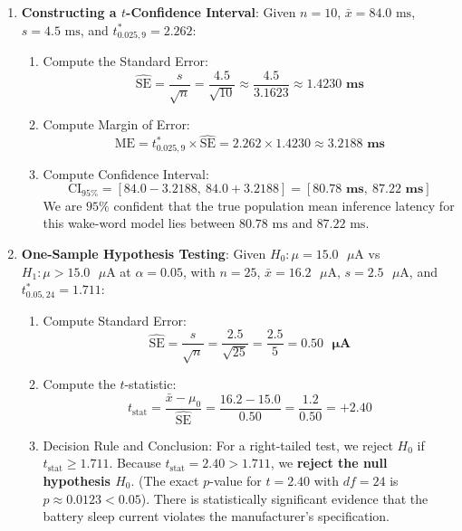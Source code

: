 \begin{enumerate}
    \item \textbf{Constructing a $t$-Confidence Interval}:
    Given $n = 10$, $\bar{x} = 84.0\text{ ms}$, $s = 4.5\text{ ms}$, and $t_{0.025, 9}^* = 2.262$:
    \begin{enumerate}[label=(\alph*)]
        \item Compute the Standard Error:
        \begin{equation*}
        \widehat{\text{SE}} = \frac{s}{\sqrt{n}} = \frac{4.5}{\sqrt{10}} \approx \frac{4.5}{3.1623} \approx \mathbf{1.4230\text{ ms}}
        \end{equation*}
        \item Compute Margin of Error:
        \begin{equation*}
        \text{ME} = t_{0.025, 9}^* \times \widehat{\text{SE}} = 2.262 \times 1.4230 \approx \mathbf{3.2188\text{ ms}}
        \end{equation*}
        \item Compute Confidence Interval:
        \begin{equation*}
        \text{CI}_{95\%} = [84.0 - 3.2188, \ 84.0 + 3.2188] = [\mathbf{80.78\text{ ms}}, \ \mathbf{87.22\text{ ms}}]
        \end{equation*}
        We are $95\%$ confident that the true population mean inference latency for this wake-word model lies between $80.78\text{ ms}$ and $87.22\text{ ms}$.
    \end{enumerate}

    \item \textbf{One-Sample Hypothesis Testing}:
    Given $H_0: \mu = 15.0\text{ }\mu\text{A}$ vs $H_1: \mu > 15.0\text{ }\mu\text{A}$ at $\alpha = 0.05$, with $n = 25$, $\bar{x} = 16.2\text{ }\mu\text{A}$, $s = 2.5\text{ }\mu\text{A}$, and $t_{0.05, 24}^* = 1.711$:
    \begin{enumerate}[label=(\alph*)]
        \item Compute Standard Error:
        \begin{equation*}
        \widehat{\text{SE}} = \frac{s}{\sqrt{n}} = \frac{2.5}{\sqrt{25}} = \frac{2.5}{5} = \mathbf{0.50\text{ }\mu\text{A}}
        \end{equation*}
        \item Compute the $t$-statistic:
        \begin{equation*}
        t_{\text{stat}} = \frac{\bar{x} - \mu_0}{\widehat{\text{SE}}} = \frac{16.2 - 15.0}{0.50} = \frac{1.2}{0.50} = \mathbf{+2.40}
        \end{equation*}
        \item Decision Rule and Conclusion:
        For a right-tailed test, we reject $H_0$ if $t_{\text{stat}} \ge 1.711$.
        Because $t_{\text{stat}} = 2.40 > 1.711$, we \textbf{reject the null hypothesis $H_0$}.
        (The exact $p$-value for $t = 2.40$ with $df = 24$ is $p \approx 0.0123 < 0.05$).
        There is statistically significant evidence that the battery sleep current violates the manufacturer's specification.
    \end{enumerate}


\end{enumerate}

